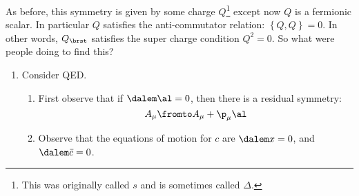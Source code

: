 \documentclass{booc}
\begin{document}
As before, this symmetry is given by some charge $Q$\footnote{
This was originally called $s$ and is sometimes called $\Delta$.}
except now $Q$ is a fermionic scalar.
In particular $Q$ satisfies the anti-commutator relation:
$\left\{ Q , Q \right\} = 0$. 
In other words, $Q_\brst$ satisfies the super charge condition $Q^2 = 0$.
So what were people doing to find this?

\begin{enumerate}
\item Consider QED. 
\begin{enumerate}
\item
First observe that if $\dalem \al = 0$, 
then there is a residual symmetry:
\begin{equation}
A_\mu \fromto A_\mu + \p_\mu \al
\end{equation}

\item Observe that the equations of motion for $c$ are
$\dalem x = 0$, and $\dalem \bar c = 0$. 


\end{enumerate}
\end{enumerate}
\end{document}
